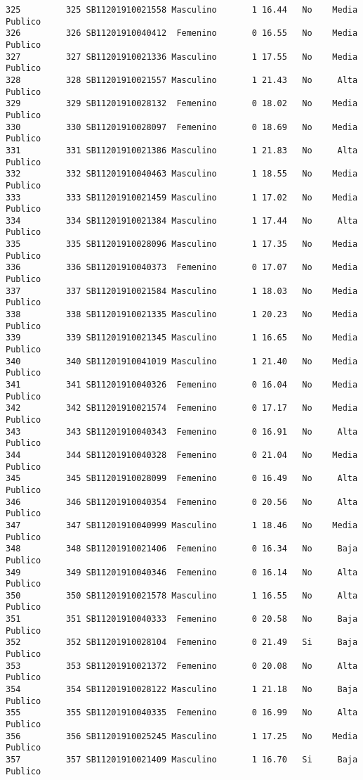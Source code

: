 \documentclass[
  letterpaper,
  DIV=11,
  numbers=noendperiod]{scrartcl}
\begin{document}
\begin{verbatim}
325         325 SB11201910021558 Masculino       1 16.44   No    Media Publico
326         326 SB11201910040412  Femenino       0 16.55   No    Media Publico
327         327 SB11201910021336 Masculino       1 17.55   No    Media Publico
328         328 SB11201910021557 Masculino       1 21.43   No     Alta Publico
329         329 SB11201910028132  Femenino       0 18.02   No    Media Publico
330         330 SB11201910028097  Femenino       0 18.69   No    Media Publico
331         331 SB11201910021386 Masculino       1 21.83   No     Alta Publico
332         332 SB11201910040463 Masculino       1 18.55   No    Media Publico
333         333 SB11201910021459 Masculino       1 17.02   No    Media Publico
334         334 SB11201910021384 Masculino       1 17.44   No     Alta Publico
335         335 SB11201910028096 Masculino       1 17.35   No    Media Publico
336         336 SB11201910040373  Femenino       0 17.07   No    Media Publico
337         337 SB11201910021584 Masculino       1 18.03   No    Media Publico
338         338 SB11201910021335 Masculino       1 20.23   No    Media Publico
339         339 SB11201910021345 Masculino       1 16.65   No    Media Publico
340         340 SB11201910041019 Masculino       1 21.40   No    Media Publico
341         341 SB11201910040326  Femenino       0 16.04   No    Media Publico
342         342 SB11201910021574  Femenino       0 17.17   No    Media Publico
343         343 SB11201910040343  Femenino       0 16.91   No     Alta Publico
344         344 SB11201910040328  Femenino       0 21.04   No    Media Publico
345         345 SB11201910028099  Femenino       0 16.49   No     Alta Publico
346         346 SB11201910040354  Femenino       0 20.56   No     Alta Publico
347         347 SB11201910040999 Masculino       1 18.46   No    Media Publico
348         348 SB11201910021406  Femenino       0 16.34   No     Baja Publico
349         349 SB11201910040346  Femenino       0 16.14   No     Alta Publico
350         350 SB11201910021578 Masculino       1 16.55   No     Alta Publico
351         351 SB11201910040333  Femenino       0 20.58   No     Baja Publico
352         352 SB11201910028104  Femenino       0 21.49   Si     Baja Publico
353         353 SB11201910021372  Femenino       0 20.08   No     Alta Publico
354         354 SB11201910028122 Masculino       1 21.18   No     Baja Publico
355         355 SB11201910040335  Femenino       0 16.99   No     Alta Publico
356         356 SB11201910025245 Masculino       1 17.25   No    Media Publico
357         357 SB11201910021409 Masculino       1 16.70   Si     Baja Publico

\end{verbatim}
\end{document}
